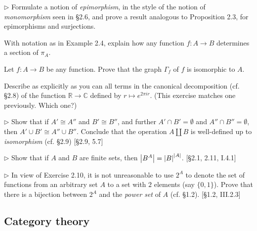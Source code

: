 \begin{problem}
  $\rhd$ Formulate a notion of \textit{epimorphism}, in the style
  of the notion of \textit{monomorphism} seen in \S 2.6, and prove a result
  analogous to Proposition 2.3, for epimorphisms and surjections.
\end{problem}

\begin{problem}
  With notation as in Example 2.4, explain how any function $f:A\to B$
  determines a section of $\pi_A$.
\end{problem}

\begin{problem}
  Let $f:A\to B$ be any function. Prove that the graph $\Gamma_f$ of $f$ is
  isomorphic to $A$.
\end{problem}

\begin{problem}
  Describe as explicitly as you can all terms in the canonical decomposition
  (cf. \S2.8) of the function $\mathbb{R}\to\mathbb{C}$ defined by $r\mapsto
  e^{2\pi ir}$. (This exercise matches one previously. Which one?)
\end{problem}

\begin{problem}
  $\rhd$ Show that if $A'\cong A''$ and $B'\cong B''$, and further
  $A'\cap B'=\emptyset$ and $A''\cap B''=\emptyset$, then
  $A'\cup B'\cong A''\cup B''$. Conclude that the operation $A\amalg B$
  is well-defined up to \textit{isomorphism} (cf. \S2.9) [\S2.9, 5.7]
\end{problem}

\begin{problem}
  $\rhd$ Show that if $A$ and $B$ are finite sets, then $\left|B^A\right| =
  \left|B\right|^{\left|A\right|}$. [\S2.1, 2.11, I.4.1]
\end{problem}

\begin{problem}
  $\rhd$ In view of Exercise 2.10, it is not unreasonable to use $2^A$ to
  denote the set of functions from an arbitrary set $A$ to a set with $2$
  elements (say $\{0,1\}$). Prove that there is a bijection between $2^A$
  and the \textit{power set} of $A$ (cf. \S1.2). [\S1.2, III.2.3]
\end{problem}

\subsection{Category theory}


